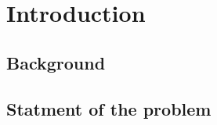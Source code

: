 \documentclass[12pt]{article}
\begin{document}
\clearpage  %
\setcounter{page}{1}    %
\pagestyle{fancy}%
\tableofcontents
{}    %

\clearpage
\section{Introduction}
\subsection{Background}

\subsection{Statment of the problem}


\end{document}
